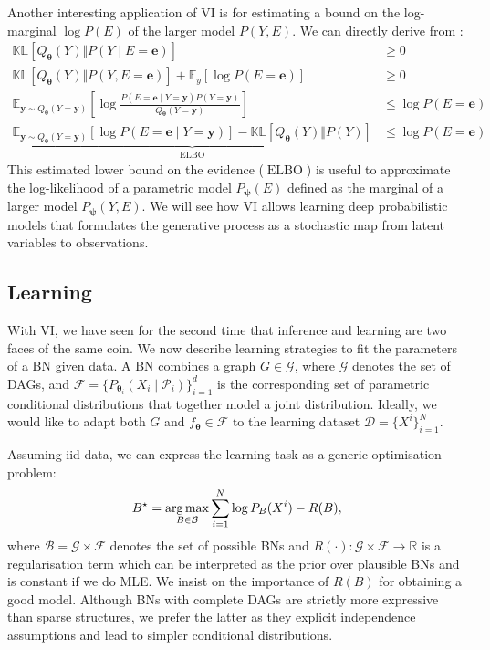 Another interesting application of VI is for estimating a bound on the log-marginal $\log P(E)$ of the larger model $P(Y, E)$. We can directly derive from :
\begin{align}
  \mathbb{KL}\left[Q_{\bm{\theta}}(Y)\Vert P(Y\mid E=\bm{e})\right] &\geq 0\\
  \mathbb{KL}\left[Q_{\bm{\theta}}(Y)\Vert P(Y, E=\bm{e}) \right] + \mathbb{E}_{y}\left[\log P(E=\bm{e})\right] &\geq 0\\
  \mathbb{E}_{\bm y \sim Q_{\bm{\theta}}(Y=\bm{y})}\left[ \log \frac{P(E=\bm{e}\mid Y=\bm{y}) P(Y=\bm{y})}{Q_{\bm{\theta}}(Y=\bm{y})} \right] &\leq \log P(E=\bm{e})\\
  \underbrace{\mathbb{E}_{\bm y \sim Q_{\bm{\theta}}(Y=\bm{y})}\left[ \log P(E=\bm{e}\mid Y=\bm{y})\right] - \mathbb{KL}\left[Q_{\bm{\theta}}(Y)\Vert P(Y)\right]}_{\operatorname{ELBO}} &\leq \log P(E=\bm{e}) \label{eq:elbo}
\end{align}
This estimated lower bound on the evidence ($\operatorname{ELBO}$) is useful to approximate the log-likelihood of a parametric model $P_{\bm \psi}(E)$ defined as the marginal of a larger model $P_{\bm \psi}(Y, E)$.
We will see how VI allows learning deep probabilistic models that formulates the generative process as a stochastic map from latent variables to observations.
\subsection{Learning}
With VI, we have seen for the second time that inference and learning are two faces of the same coin. We now describe learning strategies to fit the parameters of a BN given data.
A BN combines a graph $G \in \mathcal{G}$, where $\mathcal{G}$ denotes the set of DAGs, and $\mathcal{F} = \{P_{\bm{\theta}_i}(X_i\mid \mathcal{P}_i)\}_{i=1}^d$ is the corresponding set of parametric conditional distributions that together model a joint distribution. Ideally, we would like to adapt both $G$ and $f_{\bm{\theta}} \in \mathcal{F}$ to the learning dataset $\mathcal{D}=\{X^i\}_{i=1}^N$.

Assuming iid data, we can express the learning task as a generic optimisation problem:
\begin{align}
  B^\star  = \operatorname*{arg\,max}_{B\in\mathcal{B}} \sum_{i=1}^N \log P_B(X^i) - R(B), \label{eq:learn_BN}
\end{align}
where $\mathcal{B} = \mathcal{G} \times \mathcal{F}$ denotes the set of possible BNs and $R(\cdot): \mathcal{G} \times \mathcal{F} \rightarrow \mathbb{R}$ is a regularisation term which can be interpreted as the prior over plausible BNs and is constant if we do MLE. We insist on the importance of $R(B)$ for obtaining a good model. Although BNs with complete DAGs are strictly more expressive than sparse structures, we prefer the latter as they explicit independence assumptions and lead to simpler conditional distributions.

